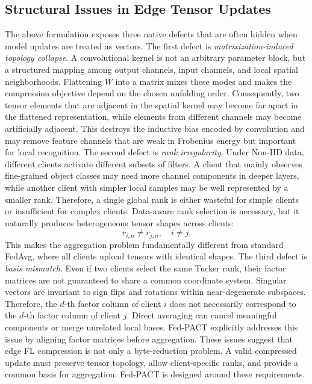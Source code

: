 \documentclass[conference]{IEEEtran}
\begin{document}
\subsection{Structural Issues in Edge Tensor Updates}
The above formulation exposes three native defects that are often hidden when model updates are treated as vectors. The first defect is \emph{matrixization-induced topology collapse}. A convolutional kernel is not an arbitrary parameter block, but a structured mapping among output channels, input channels, and local spatial neighborhoods. Flattening $W$ into a matrix mixes these modes and makes the compression objective depend on the chosen unfolding order. Consequently, two tensor elements that are adjacent in the spatial kernel may become far apart in the flattened representation, while elements from different channels may become artificially adjacent. This destroys the inductive bias encoded by convolution and may remove feature channels that are weak in Frobenius energy but important for local recognition.
The second defect is \emph{rank irregularity}. Under Non-IID data, different clients activate different subsets of filters. A client that mainly observes fine-grained object classes may need more channel components in deeper layers, while another client with simpler local samples may be well represented by a smaller rank. Therefore, a single global rank is either wasteful for simple clients or insufficient for complex clients. Data-aware rank selection is necessary, but it naturally produces heterogeneous tensor shapes across clients:
\begin{equation}
    r_{i,n} \neq r_{j,n}, \quad i\neq j.
\end{equation}
This makes the aggregation problem fundamentally different from standard FedAvg, where all clients upload tensors with identical shapes.
The third defect is \emph{basis mismatch}. Even if two clients select the same Tucker rank, their factor matrices are not guaranteed to share a common coordinate system. Singular vectors are invariant to sign flips and rotations within near-degenerate subspaces. Therefore, the $d$-th factor column of client $i$ does not necessarily correspond to the $d$-th factor column of client $j$. Direct averaging can cancel meaningful components or merge unrelated local bases. Fed-PACT explicitly addresses this issue by aligning factor matrices before aggregation.
These issues suggest that edge FL compression is not only a byte-reduction problem. A valid compressed update must preserve tensor topology, allow client-specific ranks, and provide a common basis for aggregation. Fed-PACT is designed around these requirements.
\end{document}
